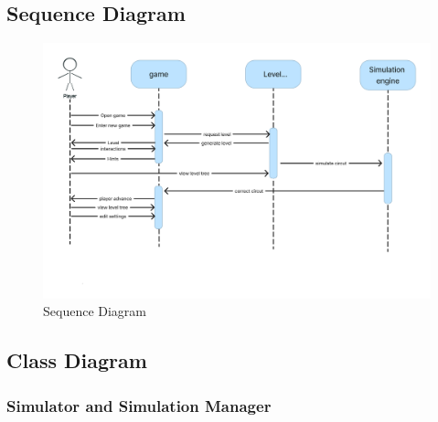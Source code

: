 \documentclass[../main.tex]{subfiles}
\begin{document}
\newpage
\subsection{Sequence Diagram}
\begin{figure}[h!t]
\centering
\includegraphics[scale=0.11]{images/chapter3/sq.png}
\caption{Sequence Diagram}
\label{Sequence Diagram}
\end{figure}



\newpage
\subsection{Class Diagram}

\subsubsection{Simulator and Simulation Manager}
\end{document}
